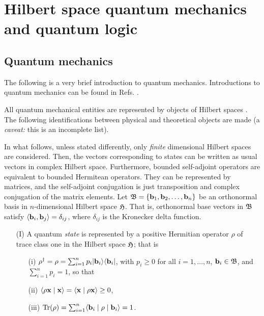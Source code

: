 {\color{Purple}

\chapter{Hilbert space quantum mechanics and quantum logic}

\section{Quantum mechanics}

The following is a very brief introduction to quantum mechanics.
Introductions to quantum mechanics can be found in
Refs. \cite{feynman-III,ba-89,messiah-61,peres,wheeler-Zurek:83}.

All quantum
mechanical entities are represented by objects
of Hilbert spaces \cite{v-neumann-49,birkhoff-36}.
The following identifications between physical and theoretical objects
are made (a {\it caveat:} this is an incomplete list).

In what follows, unless stated differently, only
{\em finite} dimensional Hilbert spaces are considered.
 Then, the vectors
corresponding to states can be written as usual vectors in complex
Hilbert space.
Furthermore, bounded
self-adjoint operators are  equivalent to bounded Hermitean operators.
They can be represented by matrices, and the self-adjoint
conjugation
is just transposition and complex conjugation of the matrix elements.
Let ${\frak B}=\{{\bf b}_1,{\bf b}_2,\ldots , {\bf b}_n\}$ be an orthonormal basis in $n$-dimensional Hilbert space ${\frak H}$.
That is,  orthonormal base vectors in ${\frak B}$
satisfy
$\langle {\bf b}_i, {\bf b}_j\rangle =\delta_{ij}$,
where $\delta_{ij}$ is the Kronecker delta function.

\begin{itemize}
\item[(I)]
 A quantum {\em   state} is represented by
a  positive Hermitian operator  ${    \rho}$
of trace class one in  the Hilbert space ${\frak H} $;
that is
\begin{itemize}
\item[(i)]
 ${    \rho}^\dagger ={    \rho}=\sum_{i=1}^n p_i  \vert {\bf b}_i \rangle \langle {\bf b}_i  \vert $,
    with  $p_i\ge 0$ for all $i=1,\ldots , n$, ${\bf b}_i \in {\frak B}$, and $\sum_{i=1}^n p_i =1$, so that
\item[(ii)]
$\langle {    \rho}{\bf x}\mid {\bf x}\rangle =\langle {\bf x}\mid {    \rho}{\bf x}\rangle  \ge 0$,
\item[(iii)]
$\textrm{Tr}( {    \rho})=\sum_{i=1}^n \langle {\bf b}_i \mid {    \rho} \mid  {\bf b}_i \rangle =1 $.
\end{itemize}


\end{itemize}}
